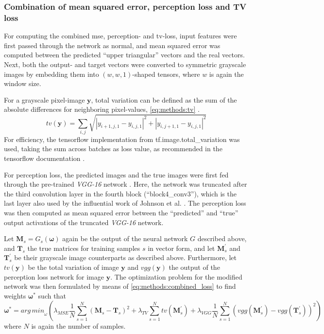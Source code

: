 \subsubsection{Combination of mean squared error, perception loss and TV loss} \label{sec:methods:combined_loss}
For computing the combined \acrshort{mse}, perception- and \acrshort{tv}-loss,
input features were first passed through the network as normal,
and mean squared error was computed between the predicted ``upper triangular'' vectors and the real vectors.
Next, both the output- and target vectors were converted to symmetric grayscale images by embedding them into 
$(w, w, 1)$-shaped tensors, where $w$ is again the window size.

For a grayscale pixel-image $\mathbf{y}$, total variation can be defined as the sum of the absolute differences for neighboring pixel-values, \cref{eq:methods:tv} \cite{Rudin1992, wikiTV2021}.
\begin{equation}
 tv(\mathbf{y}) = \sum_{i,j}\sqrt{|y_{i+1,j,1} - y_{i,j,1}|^2 + |y_{i,j+1,1} - y_{i,j,1} |^2 } \label{eq:methods:tv}
\end{equation}
For efficiency, the tensorflow implementation from tf.image.total\_variation was used,
taking the sum across batches as loss value, as recommended in the tensorflow documentation \cite{TensorflowTV2020}.

For perception loss, the predicted images and the true images were first fed through the pre-trained \emph{VGG-16} network \cite{Simonyan2015}.
Here, the network was truncated after the third convolution layer in the fourth block (``block4\_conv3''), which is the last layer also used by the influential work of Johnson et al. \cite{Johnson2016}.
The perception loss was then computed as mean squared error between the ``predicted'' and ``true'' output activations of the truncated \emph{VGG-16} network.

Let $\mathbf{M}_s=G_s(\bm{\omega})$ again be the output of the neural network $G$ described above, and $\mathbf{T}_s$ the true matrices for training samples $s$ in vector form,
and let $\mathbf{M}^\prime_s$ and $\mathbf{T}^\prime_s$ be their grayscale image counterparts as described above.
Furthermore, let $\mathit{tv}(\bm{y})$ be the total variation of image $\bm{y}$ and $\mathit{vgg}(\bm{y})$ the output of the perception loss network for image $\bm{y}$.
The optimization problem for the modified network was then formulated by means of \cref{eq:methods:combined_loss} to find weights $\bm{\omega}^*$ such that
\begin{equation}
 \bm{\omega}^* = \mathit{arg\,min}_\omega (  \lambda_\mathit{MSE} \frac{1}{N} \sum_{s=1}^N (\mathbf{M}_s - \mathbf{T}_s)^2 
                                                     + \lambda_\mathit{TV} \sum_{s=1}^N \mathit{tv}( \mathbf{M}^\prime_s) 
                                                     + \lambda_\mathit{VGG} \frac{1}{N} \sum_{s=1}^N (\mathit{vgg}(\mathbf{M}^\prime_s) - \mathit{vgg}(\mathbf{T}^\prime_s))^2 ) \label{eq:methods:combined_loss}
\end{equation}
where $N$ is again the number of samples. 

